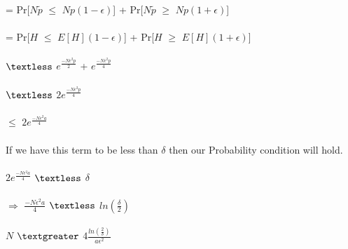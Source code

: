 \documentclass{article}
\begin{document}
= Pr[$N\widetilde{p}$ $\leq$ $Np(1 - \epsilon)$]
+ Pr[$N\widetilde{p}$ $\geq$ $Np(1 + \epsilon)$] \\\\
= Pr[$H$ $\leq$ $E[H](1-\epsilon)$] + Pr[$H$ $\geq$ $E[H](1+\epsilon)$] \\\\ $\textless$ $e^{\frac{-N\epsilon^{2}p}{2}}$ + $e^{\frac{-N\epsilon^{2}p}{4}}$ \\\\ $\textless$ $2e^{\frac{-N\epsilon^{2}p}{4}}$ \\\\ $\leq$ $2e^{\frac{-N\epsilon^{2}a}{4}}$ \\\\
If we have this term to be less than $\delta$ then our Probability condition will hold.\\\\ 
$2e^{\frac{-N\epsilon^{2}a}{4}}$ $\textless$ $\delta$ \\\\
$\Longrightarrow$
$\frac{-N\epsilon^{2}a}{4}$ $\textless$ $ln(\frac{\delta}{2})$
\\\\
$N$ $\textgreater$ $4\frac{ln(\frac{2}{\delta})}{a\epsilon^{2}}$
\end{document}
